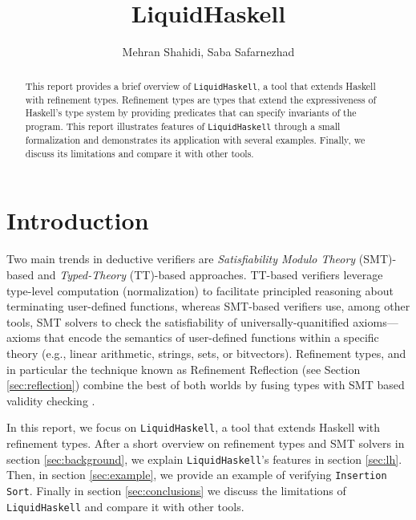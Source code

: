 \documentclass[]{rptuseminar}
\title{\textbf{Liquid}{H}\textbf{askell}}
\author{Mehran Shahidi, Saba Safarnezhad
  \institute{Rheinland-Pfälzische Technische Universität Kaiserslautern-Landau, Department of Computer Science}}
\begin{document}

\maketitle


\begin{abstract}
  This report provides a brief overview of \texttt{LiquidHaskell}, a tool that extends Haskell with refinement types. 
  Refinement types are types that extend the expressiveness of Haskell's type system by providing predicates that can specify invariants of the program. 
  This report illustrates features of \texttt{LiquidHaskell} through a small formalization and demonstrates its application with several examples. 
  Finally, we discuss its limitations and compare it with other tools.
\end{abstract}


\section{Introduction}
\label{sec:introduction}
Two main trends in deductive verifiers are \textit{Satisfiability Modulo Theory} (SMT)-based and \textit{Typed-Theory} (TT)-based approaches. 
TT-based verifiers leverage type-level computation (normalization) to facilitate principled reasoning about terminating user-defined functions,
whereas SMT-based verifiers use, among other tools, SMT solvers to check the satisfiability of universally-quanitified axioms—axioms 
that encode the semantics of user-defined functions within a specific theory (e.g., linear arithmetic, strings, sets, or bitvectors).
Refinement types, and in particular the technique known as Refinement Reflection (see Section \ref {sec:reflection}) combine the best of both worlds by fusing types with SMT based validity checking \cite{vazou_refinement_2018}.

In this report, we focus on \texttt{LiquidHaskell}, a tool that extends Haskell with refinement types.
After a short overview on refinement types and SMT solvers in section \ref{sec:background}, 
we explain \texttt{LiquidHaskell}'s features in section \ref{sec:lh}. Then, in section \ref{sec:example}, we provide an example of verifying \texttt{Insertion Sort}. 
Finally in section \ref{sec:conclusions} we 
discuss the limitations of \texttt{LiquidHaskell} and compare it with other tools.
\end{document}
